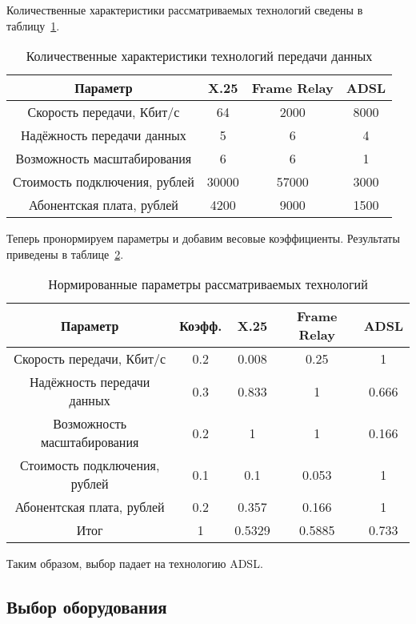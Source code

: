 Количественные характеристики рассматриваемых технологий сведены в таблицу~\ref{table:ISP_compare_numb}.

\begin{table}[h]
\caption{Количественные характеристики технологий передачи данных}
\label{table:ISP_compare_numb}
\centering
  \begin{tabular}{|c|c|c|c|}
  \hline Параметр & X.25 & Frame Relay & ADSL \\
  \hline Скорость передачи, Кбит/с & 64 & 2000 & 8000 \\
  \hline Надёжность передачи данных & 5 & 6 & 4 \\
  \hline Возможность масштабирования & 6 & 6 & 1 \\
  \hline Стоимость подключения, рублей & 30000 & 57000 & 3000 \\
  \hline Абонентская плата, рублей & 4200 & 9000 & 1500 \\
  \hline
  \end{tabular}
\end{table}

Теперь пронормируем параметры и добавим весовые коэффициенты. Результаты приведены в таблице~\ref{table:ISP_compare}.

\begin{table}[h]
\caption{Нормированные параметры рассматриваемых технологий}
\label{table:ISP_compare}
\centering
  \begin{tabular}{|c|c|c|c|c|}
  \hline Параметр & Коэфф. & X.25 & Frame Relay & ADSL \\
  \hline Скорость передачи, Кбит/с & 0.2 & 0.008 & 0.25 & 1 \\
  \hline Надёжность передачи данных & 0.3 & 0.833 & 1 & 0.666 \\
  \hline Возможность масштабирования & 0.2 & 1 & 1 & 0.166 \\
  \hline Стоимость подключения, рублей & 0.1 & 0.1 & 0.053 & 1 \\
  \hline Абонентская плата, рублей & 0.2 & 0.357 & 0.166 & 1 \\
  \hline Итог & 1 & 0.5329 & 0.5885 & 0.733 \\
  \hline
  \end{tabular}
\end{table}

Таким образом, выбор падает на технологию ADSL.

\subsection{Выбор оборудования}

